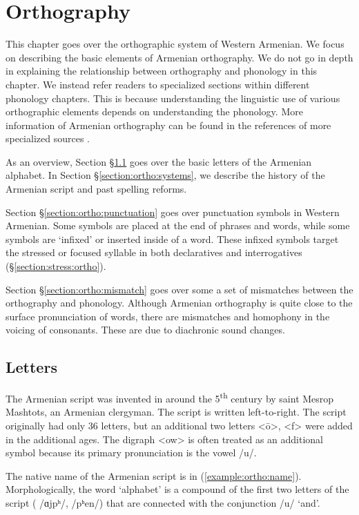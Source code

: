 
\chapter{Orthography}\label{chapter:ortho}
This chapter goes over the orthographic system of Western Armenian. We focus on describing the basic elements of Armenian orthography. We do not go in depth in explaining the relationship between orthography and phonology in this chapter. We instead refer readers to specialized sections within different phonology chapters.  This is because understanding the linguistic use of various orthographic elements depends on understanding the phonology. More information of Armenian orthography can be found in the references of  more specialized sources \citep{sanjian-1996-armenianAlphabet}. 



As an overview, Section \S\ref{section:ortho:letter} goes over the basic letters of the Armenian alphabet. In Section \S\ref{section:ortho:systems}, we describe the history of the Armenian script and past spelling reforms. 

Section  \S\ref{section:ortho:punctuation} goes over punctuation symbols in Western Armenian. Some symbols are placed at the end of phrases and words, while some symbols are `infixed' or inserted inside of a word. These infixed symbols target the stressed or focused syllable in both declaratives and interrogatives (\S\ref{section:stress:ortho}). 


Section \S\ref{section:ortho:mismatch} goes over some a set of mismatches between the orthography and phonology. Although Armenian orthography is quite close to the surface pronunciation of words, there are mismatches and homophony in the voicing of consonants. These are due to diachronic sound changes. 


\section{Letters}\label{section:ortho:letter}
The Armenian script was invented in around the 5\textsuperscript{th} century by saint Mesrop Mashtots, an Armenian clergyman. The script is written left-to-right. The script originally had only 36 letters, but an additional two letters   <ō>,   <f>  were added in the additional ages. The digraph  <ow> is often treated as an additional symbol because its primary pronunciation is the vowel /u/.  

The native name of the Armenian script is  in (\ref{example:ortho:name}). Morphologically, the word `alphabet' is a compound of the first two letters of the script ( /ɑjpʰ/,   /pʰen/) that are connected with the conjunction /u/ `and'. 



